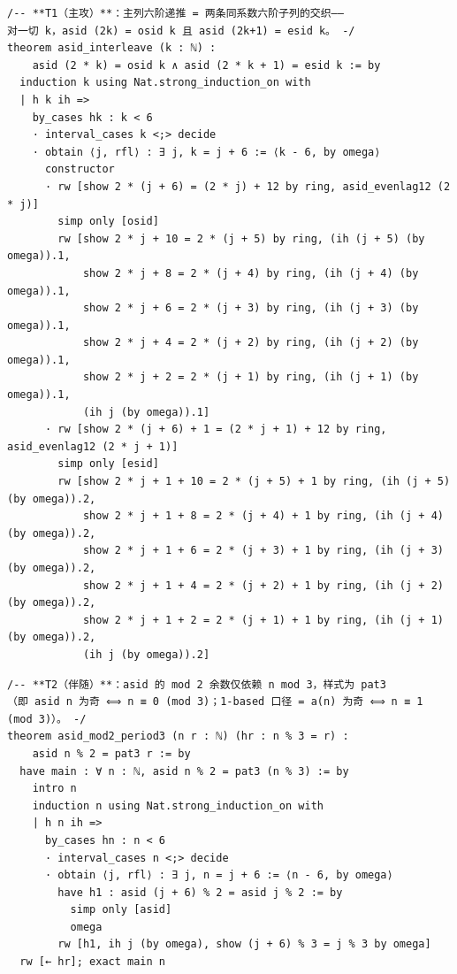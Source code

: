 \documentclass[11pt]{article}
\theoremstyle{definition}
\begin{document}
\begin{lstlisting}[caption={Complete proof of Theorem~\ref{thm:interleave}, verbatim from \texttt{final}\allowbreak/\texttt{01-comb08-sidemid-proved.lean} (lines 117--142, sha256 \texttt{19b5c390}).},label={lst:proof-t1}]
/-- **T1（主攻）**：主列六阶递推 = 两条同系数六阶子列的交织——
对一切 k，asid (2k) = osid k 且 asid (2k+1) = esid k。 -/
theorem asid_interleave (k : ℕ) :
    asid (2 * k) = osid k ∧ asid (2 * k + 1) = esid k := by
  induction k using Nat.strong_induction_on with
  | h k ih =>
    by_cases hk : k < 6
    · interval_cases k <;> decide
    · obtain ⟨j, rfl⟩ : ∃ j, k = j + 6 := ⟨k - 6, by omega⟩
      constructor
      · rw [show 2 * (j + 6) = (2 * j) + 12 by ring, asid_evenlag12 (2 * j)]
        simp only [osid]
        rw [show 2 * j + 10 = 2 * (j + 5) by ring, (ih (j + 5) (by omega)).1,
            show 2 * j + 8 = 2 * (j + 4) by ring, (ih (j + 4) (by omega)).1,
            show 2 * j + 6 = 2 * (j + 3) by ring, (ih (j + 3) (by omega)).1,
            show 2 * j + 4 = 2 * (j + 2) by ring, (ih (j + 2) (by omega)).1,
            show 2 * j + 2 = 2 * (j + 1) by ring, (ih (j + 1) (by omega)).1,
            (ih j (by omega)).1]
      · rw [show 2 * (j + 6) + 1 = (2 * j + 1) + 12 by ring, asid_evenlag12 (2 * j + 1)]
        simp only [esid]
        rw [show 2 * j + 1 + 10 = 2 * (j + 5) + 1 by ring, (ih (j + 5) (by omega)).2,
            show 2 * j + 1 + 8 = 2 * (j + 4) + 1 by ring, (ih (j + 4) (by omega)).2,
            show 2 * j + 1 + 6 = 2 * (j + 3) + 1 by ring, (ih (j + 3) (by omega)).2,
            show 2 * j + 1 + 4 = 2 * (j + 2) + 1 by ring, (ih (j + 2) (by omega)).2,
            show 2 * j + 1 + 2 = 2 * (j + 1) + 1 by ring, (ih (j + 1) (by omega)).2,
            (ih j (by omega)).2]
\end{lstlisting}

\begin{lstlisting}[caption={Complete proof of Theorem~\ref{thm:mod2}, verbatim from \texttt{final}\allowbreak/\texttt{01-comb08-sidemid-proved.lean} (lines 144--159, sha256 \texttt{19b5c390}).},label={lst:proof-t2}]
/-- **T2（伴随）**：asid 的 mod 2 余数仅依赖 n mod 3，样式为 pat3
（即 asid n 为奇 ⟺ n ≡ 0 (mod 3)；1-based 口径 = a(n) 为奇 ⟺ n ≡ 1 (mod 3)）。 -/
theorem asid_mod2_period3 (n r : ℕ) (hr : n % 3 = r) :
    asid n % 2 = pat3 r := by
  have main : ∀ n : ℕ, asid n % 2 = pat3 (n % 3) := by
    intro n
    induction n using Nat.strong_induction_on with
    | h n ih =>
      by_cases hn : n < 6
      · interval_cases n <;> decide
      · obtain ⟨j, rfl⟩ : ∃ j, n = j + 6 := ⟨n - 6, by omega⟩
        have h1 : asid (j + 6) % 2 = asid j % 2 := by
          simp only [asid]
          omega
        rw [h1, ih j (by omega), show (j + 6) % 3 = j % 3 by omega]
  rw [← hr]; exact main n
\end{lstlisting}
\end{document}
